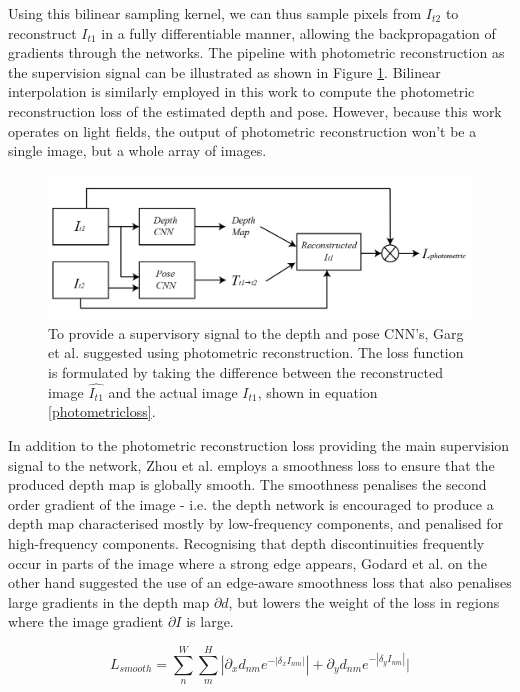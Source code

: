 \documentclass[openany]{book}
\begin{document}
Using this bilinear sampling kernel, we can thus sample pixels from $I_{t2}$ to reconstruct $I_{t1}$ in a fully differentiable manner, allowing the backpropagation of gradients through the networks. The pipeline with photometric reconstruction as the supervision signal can be illustrated as shown in Figure \ref{supervisedMLCNNS}. Bilinear interpolation is similarly employed in this work to compute the photometric reconstruction loss of the estimated depth and pose. However, because this work operates on light fields, the output of photometric reconstruction won't be a single image, but a whole array of images.


\begin{figure}
    \centering 
    \includegraphics[width=5in]{images/mlpipeline.png}
    \caption{To provide a supervisory signal to the depth and pose CNN's, Garg et al. \cite{garg2016unsupervised} suggested using photometric reconstruction. The loss function is formulated by taking the difference between the reconstructed image $\hat{I_{t1}}$ and the actual image $I_{t1}$, shown in equation \ref{photometricloss}.}
    \label{supervisedMLCNNS}
\end{figure}


In addition to the photometric reconstruction loss providing the main supervision signal to the network, Zhou et al. \cite{zhou2017unsupervised} employs a smoothness loss to ensure that the produced depth map is globally smooth. The smoothness penalises the second order gradient of the image - i.e. the depth network is encouraged to produce a depth map characterised mostly by low-frequency components, and penalised for high-frequency components. Recognising that depth discontinuities frequently occur in parts of the image where a strong edge appears, Godard et al. \cite{godard2016consistency} on the other hand suggested the use of an edge-aware smoothness loss that also penalises large gradients in the depth map $\partial{d}$, but lowers the weight of the loss in regions where the image gradient $\partial{I}$ is large. 

\begin{equation}
    L_{smooth} =  \sum_n^W \sum_m^H |\partial_x d_{nm} e^{-|\delta_x I_{nm}|}| + \partial_y d_{nm} e^{-|\delta_y I_{nm}|}|
\end{equation}
\end{document}

